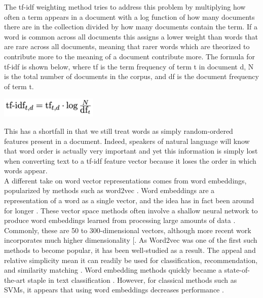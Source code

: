 The tf-idf weighting method tries to address this problem by multiplying how often a term appears in a document with a log function of how many documents there are in the collection divided by how many documents contain the term. If a word is common across all documents this assigns a lower weight than words that are rare across all documents, meaning that rarer words which are theorized to contribute more to the meaning of a document contribute more. The formula for tf-idf is shown below, where tf is the term frequency of term t in document d, N is the total number of documents in the corpus, and df is the document frequency of term t.
\\
\begin{center}
	\includegraphics[width=0.35\textwidth]{tf-idf.png}
\end{center}

This has a shortfall in that we still treat words as simply random-ordered features present in a document. Indeed, speakers of natural language will know that word order is actually very important and yet this information is simply lost when converting text to a tf-idf feature vector because it loses the order in which words appear.\\

A different take on word vector representations comes from word embeddings, popularized by methods such as word2vec \cite{Mikolov2013}. Word embeddings are a representation of a word as a single vector, and the idea has in fact been around for longer \cite{Bengio2003}. These vector space methods often involve a shallow neural network to produce word embeddings learned from processing large amounts of data \cite{Mikolov2013, Levy2014, Goldberg2016}. Commonly, these are 50 to 300-dimensional vectors, although more recent work incorporates much higher dimensionality [\cite{Devlin2018, Peters2018}. As Word2vec was one of the first such methods to become popular, it has been well-studied as a result. The appeal and relative simplicity mean it can readily be used for classification, recommendation, and similarity matching \cite{Kenter2015}. Word embedding methods quickly became a state-of-the-art staple in text classification \cite{Peters2018, Howard2018}. However, for classical methods such as SVMs, it appears that using word embeddings decreases performance \cite{Lilleberg2015}.\\

